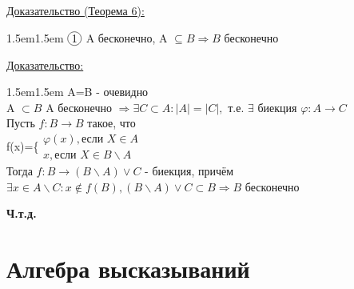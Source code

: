 \documentclass[12pt]{article}
\newcommand*\circled[1]{\tikz[baseline=(char.base)]{
    \node[shape=circle, draw, inner sep=1pt, 
        minimum height=12pt] (char) {#1};}}
\begin{document}
    \pagebreak

    \underline{Доказательство (Теорема 6):}
    \begin{adjustwidth}{1.5em}{1.5em}
        $\circled{1}$ A бесконечно, A $\subseteq B \Rightarrow B$ бесконечно
    \end{adjustwidth}

    \underline{Доказательство:}
    \begin{adjustwidth}{1.5em}{1.5em}
        A=B - очевидно\\
        A $\subset B $ A бесконечно $\Rightarrow \exists C \subset A:|A|=|C|,$ т.е. $\exists$ биекция $\varphi: A \rightarrow C$\\
        Пусть $f:B\rightarrow B$ такое, что\\
        f(x)=\Bigg\{$\begin{matrix}
            \varphi(x), \text{если } X \in A\\
            x, \text{если } X \in B \backslash A
        \end{matrix}$\\
        Тогда $f:B \rightarrow (B \backslash A) \lor C$ - биекция, причём $\exists x \in A \backslash C: x \not \in f(B),
        (B\backslash A) \lor C \subset B \Rightarrow B$ бесконечно
    \end{adjustwidth}
    \begin{center}
        \textbf{Ч.т.д.}
    \end{center}
    \section{Алгебра высказываний}
\end{document}
